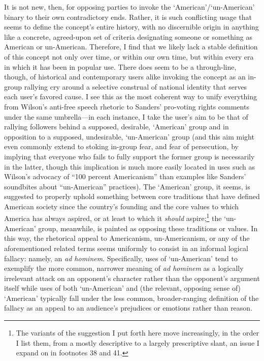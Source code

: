 It is not new, then, for opposing parties to invoke the
`American'/`un-American' binary to their own contradictory ends. Rather,
it is such conflicting usage that seems to define the concept's entire
history, with no discernible origin in anything like a concrete,
agreed-upon set of criteria designating someone or something as American
or un-American. Therefore, I find that we likely lack a stable
definition of this concept not only over time, or within our own time,
but within every era in which it has been in popular use. There does
seem to be a through-line, though, of historical and contemporary users
alike invoking the concept as an in-group rallying cry around a
selective construal of national identity that serves each user's favored
cause. I see this as the most coherent way to unify everything from
Wilson's anti-free speech rhetoric to Sanders' pro-voting rights
comments under the same umbrella---in each instance, I take the user's
aim to be that of rallying followers behind a supposed, desirable,
`American' group and in opposition to a supposed, undesirable,
`un-American' group (and this aim might even commonly extend to stoking
in-group fear, and fear of persecution, by implying that everyone who
fails to fully support the former group is necessarily in the latter,
though this implication is much more easily located in uses such as
Wilson's advocacy of ``100 percent Americanism'' than examples like
Sanders' soundbites about ``un-American'' practices). The `American'
group, it seems, is suggested to properly uphold something between core
traditions that have defined American society since the country's
founding and the core values to which America has always aspired, or at
least to which it \emph{should} aspire;\footnote{The variants of the
  suggestion I put forth here move increasingly, in the order I list
  them, from a mostly descriptive to a largely prescriptive slant, an
  issue I expand on in footnotes 38 and 41.} the `un-American' group,
meanwhile, is painted as opposing these traditions or values. In this
way, the rhetorical appeal to Americanism, un-Americanism, or any of the
aforementioned related terms seems uniformly to consist in an informal
logical fallacy: namely, an \emph{ad hominem}. Specifically, uses of
`un-American' tend to exemplify the more common, narrower meaning of
\emph{ad hominem} as a logically irrelevant attack on an opponent's
character rather than the opponent's argument itself while uses of both
`un-American' and (the relevant, opposing sense of) `American' typically
fall under the less common, broader-ranging definition of the fallacy as
an appeal to an audience's prejudices or emotions rather than reason.

